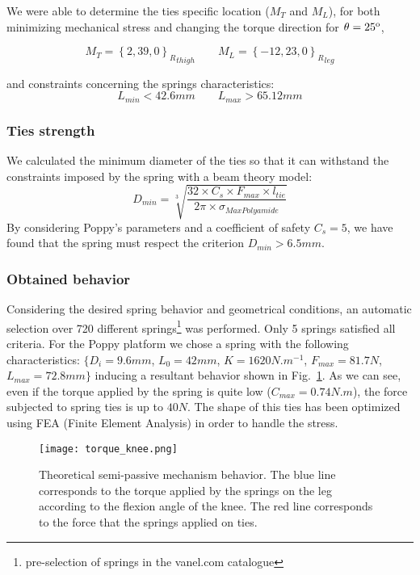 We were able to determine the ties specific location ($M_T$ and $M_L$), for both minimizing mechanical stress and changing the torque direction for $\theta = 25\textsuperscript{o}$,


\begin{equation}
    M_T={\left \{2,39,0 \right \}_R}_{thigh}
    \qquad
    M_L = {\left \{-12,23,0 \right \}_R}_{leg}
\end{equation}

and constraints concerning the springs characteristics:
\begin{equation}
    L_{min} < 42.6 mm
    \qquad
    L_{max} > 65.12 mm
\end{equation}


\subsubsection{Ties strength} %
\label{par:ties_strength}

We calculated the minimum diameter of the ties so that it can withstand the constraints imposed by the spring with a beam theory model:
\begin{equation}
    D_{min}= \sqrt[3]{ \frac{32 \times  C_s \times F_{max} \times l_{tie}}{2 \pi \times \sigma_{MaxPolyamide}} }
\end{equation}
By considering Poppy's parameters and a coefficient of safety $C_s = 5$, we have found that the spring must respect the criterion $D_{min} > 6.5 mm$.

\subsubsection{Obtained behavior} %
\label{sub:obtained_behavior}

Considering the desired spring behavior and geometrical conditions, an automatic selection over 720 different springs\footnote{pre-selection of springs in the vanel.com catalogue} was performed. Only 5 springs satisfied all criteria. For the Poppy platform we chose a spring with the following characteristics: $\{ D_i=9.6mm$, $L_0=42mm$, $K=1620N.m^{-1}$, $F_{max}=81.7 N$, $L_{max}=72.8 mm \}$ inducing a resultant behavior shown in Fig.~\ref{fig:knee_feature}. As we can see, even if the torque applied by the spring is quite low ($C_{max} = 0.74 N.m$), the force subjected to spring ties is up to $40N$. The shape of this ties has been optimized using FEA (Finite Element Analysis) in order to handle the stress.

\begin{figure}[h]
    \centering
    \texttt{[image: torque\_knee.png]}
    \caption{Theoretical semi-passive mechanism behavior. The blue line corresponds to the torque applied by the springs on the leg according to the flexion angle of the knee. The red line corresponds to the force that the springs applied on ties.}
    \label{fig:knee_feature}
\end{figure}

